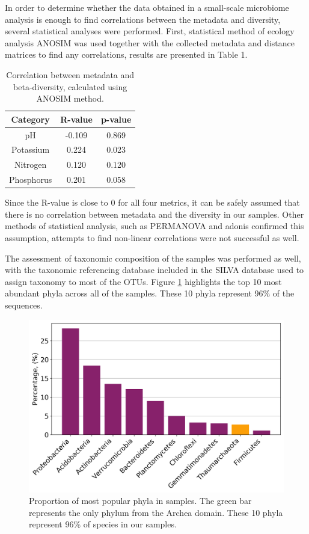 \documentclass[12pt,twocolumn]{article}
\begin{document}
\par
In order to determine whether the data obtained in a small-scale microbiome analysis is enough to find correlations between the metadata and diversity, several statistical analyses were performed. First, statistical method of ecology analysis ANOSIM\cite{CLARKE1993} was used together with the collected metadata and distance matrices to find any correlations, results are presented in Table 1.
\begin{table}[ht!] %
	\begin{center}
		\label{tab:table_correlation}
		\begin{tabular}{c|c|c}
			\textbf{Category} & \textbf{R-value} & \textbf{p-value}\\
			\hline
			pH & -0.109 & 0.869\\
			Potassium & 0.224 & 0.023\\
			Nitrogen & 0.120 & 0.120 \\
			Phosphorus & 0.201 & 0.058\\
		\end{tabular}
		\caption{Correlation between metadata and beta-diversity, calculated using ANOSIM\cite{CLARKE1993} method.}
	\end{center}
\end{table}
\par
Since the R-value is close to 0 for all four metrics, it can be safely assumed that there is no correlation between metadata and the diversity in our samples. Other methods of statistical analysis, such as PERMANOVA and adonis confirmed this assumption, attempts to find non-linear correlations were not successful as well.
\par
The assessment of taxonomic composition of the samples was performed as well, with the taxonomic referencing database included in the SILVA database used to assign taxonomy to most of the OTUs. Figure \ref{fig:top_taxa} highlights the top 10 most abundant phyla across all of the samples. These 10 phyla represent 96\% of the sequences.
\begin{figure}[ht!] %
	\includegraphics[width=\linewidth]{top_10.png}
	\caption{Proportion of most popular phyla in samples. The green bar represents the only phylum from the Archea domain. These 10 phyla represent 96\% of species in our samples.}
	\label{fig:top_taxa}
\end{figure}
\end{document}
